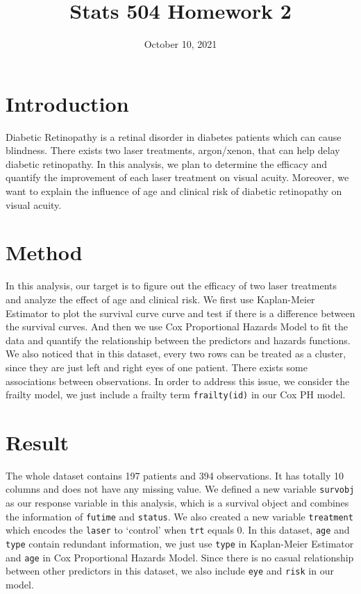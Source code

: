\documentclass[
]{article}
\title{Stats 504 Homework 2}
\author{}
\date{\vspace{-2.5em}October 10, 2021}
\begin{document}
\maketitle

\hypertarget{introduction}{%
\section{Introduction}\label{introduction}}

Diabetic Retinopathy is a retinal disorder in diabetes patients which
can cause blindness. There exists two laser treatments, argon/xenon,
that can help delay diabetic retinopathy. In this analysis, we plan to
determine the efficacy and quantify the improvement of each laser
treatment on visual acuity. Moreover, we want to explain the influence
of age and clinical risk of diabetic retinopathy on visual acuity.

\hypertarget{method}{%
\section{Method}\label{method}}

In this analysis, our target is to figure out the efficacy of two laser
treatments and analyze the effect of age and clinical risk. We first use
Kaplan-Meier Estimator to plot the survival curve curve and test if
there is a difference between the survival curves. And then we use Cox
Proportional Hazards Model to fit the data and quantify the relationship
between the predictors and hazards functions. We also noticed that in
this dataset, every two rows can be treated as a cluster, since they are
just left and right eyes of one patient. There exists some associations
between observations. In order to address this issue, we consider the
frailty model, we just include a frailty term \texttt{frailty(id)} in
our Cox PH model.

\hypertarget{result}{%
\section{Result}\label{result}}

The whole dataset contains 197 patients and 394 observations. It has
totally 10 columns and does not have any missing value. We defined a new
variable \texttt{survobj} as our response variable in this analysis,
which is a survival object and combines the information of
\texttt{futime} and \texttt{status}. We also created a new variable
\texttt{treatment} which encodes the \texttt{laser} to `control' when
\texttt{trt} equals 0. In this dataset, \texttt{age} and \texttt{type}
contain redundant information, we just use \texttt{type} in Kaplan-Meier
Estimator and \texttt{age} in Cox Proportional Hazards Model. Since
there is no casual relationship between other predictors in this
dataset, we also include \texttt{eye} and \texttt{risk} in our model.
\end{document}
